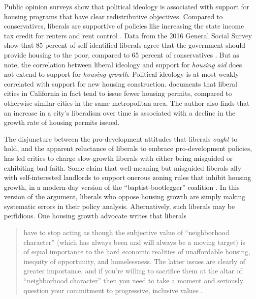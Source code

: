 \documentclass[article,11pt]{memoir}
\begin{document}
Public opinion surveys show that political ideology is associated with support for housing programs that have clear redistributive objectives.  Compared to conservatives, liberals are supportive of policies like increasing the state income tax credit for renters and rent control \citep{marble_where_2018}.  Data from the 2016 General Social Survey show that 85 percent of self-identified liberals agree that the government should provide housing to the poor, compared to 65 percent of conservatives \citep{smith_general_2016}.  But as \cite{marble_where_2018} note, the correlation between liberal ideology and support for \emph{housing aid} does not extend to support for \emph{housing growth}.  Political ideology is at most weakly correlated with support for new housing construction. \cite{kahn_liberal_2011} documents that liberal cities in California in fact tend to issue fewer housing permits, compared to otherwise similar cities in the same metropolitan area.  The author also finds that an increase in a city's liberalism over time is associated with a decline in the growth rate of housing permits issued.  

The disjuncture between the pro-development attitudes that liberals \emph{ought} to hold, and the apparent reluctance of liberals to embrace pro-development policies, has led critics to charge slow-growth liberals with either being misguided or exhibiting bad faith.  Some claim that well-meaning but misguided liberals ally with self-interested landlords to support onerous zoning rules that inhibit housing growth, in a modern-day version of the ``baptist-bootlegger'' coalition \citep{somin_opinion_2017}. In this version of the argument, liberals who oppose housing growth are simply making systematic errors in their policy analysis.  Alternatively, such liberals may be perfidious. One housing growth advocate writes that liberals
\begin{quote}
have to stop acting as though the subjective value of ``neighborhood character'' (which has always been and will always be a moving target) is of equal importance to the hard economic realities of unaffordable housing, inequity of opportunity, and homelessness. The latter issues are clearly of greater importance, and if you're willing to sacrifice them at the altar of ``neighborhood character'' then you need to take a moment and seriously question your commitment to progressive, inclusive values \citep{phillips_disconnect_2016}.
\end{quote}
\end{document}
